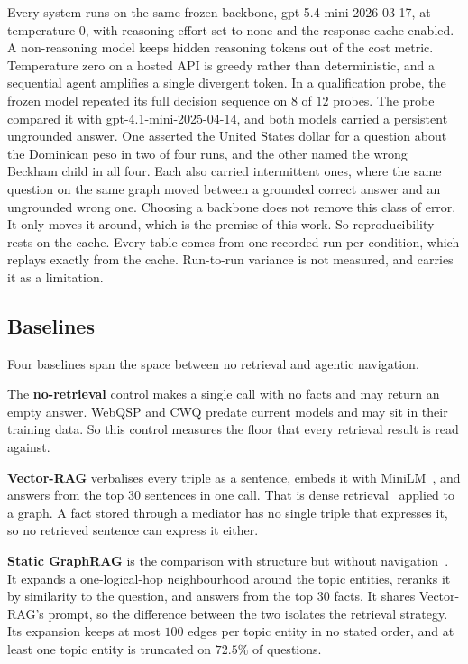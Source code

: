 Every system runs on the same frozen backbone, \textsf{gpt-5.4-mini-2026-03-17},
at temperature $0$, with reasoning effort set to \textsf{none} and the response
cache enabled. A non-reasoning model keeps hidden reasoning tokens out of the
cost metric. Temperature zero on a hosted API is greedy rather than
deterministic, and a sequential agent amplifies a single divergent token. In a
qualification probe, the frozen model repeated its full decision sequence on $8$
of $12$ probes. The probe compared it with \textsf{gpt-4.1-mini-2025-04-14}, and
both models carried a persistent ungrounded answer. One asserted the United
States dollar for a question about the Dominican peso in two of four runs, and
the other named the wrong Beckham child in all four. Each also carried
intermittent ones, where the same question on the same graph moved between a
grounded correct answer and an ungrounded wrong one. Choosing a backbone does
not remove this class of error. It only moves it around, which is the premise of
this work. So reproducibility rests on the cache. Every table comes from one
recorded run per condition, which replays exactly from the cache. Run-to-run
variance is not measured, and  carries it as a limitation.

\subsection{Baselines}\label{sec:baselines}

Four baselines span the space between no retrieval and agentic navigation.

The \textbf{no-retrieval} control makes a single call with no facts and may
return an empty answer. WebQSP and CWQ predate current models and may sit in
their training data. So this control measures the floor that every retrieval
result is read against.

\textbf{Vector-RAG} verbalises every triple as a sentence, embeds it with
MiniLM~\cite{reimers2019sentence}, and answers from the top $30$ sentences in
one call. That is dense retrieval~\cite{karpukhin2020dense} applied to a graph.
A fact stored through a mediator has no single triple that expresses it, so no
retrieved sentence can express it either.

\textbf{Static GraphRAG} is the comparison with structure but without
navigation~\cite{edge2024local}. It expands a one-logical-hop neighbourhood
around the topic entities, reranks it by similarity to the question, and answers
from the top $30$ facts. It shares Vector-RAG's prompt, so the difference
between the two isolates the retrieval strategy. Its expansion keeps at most
$100$ edges per topic entity in no stated order, and at least one topic entity
is truncated on $72.5\%$ of questions.


